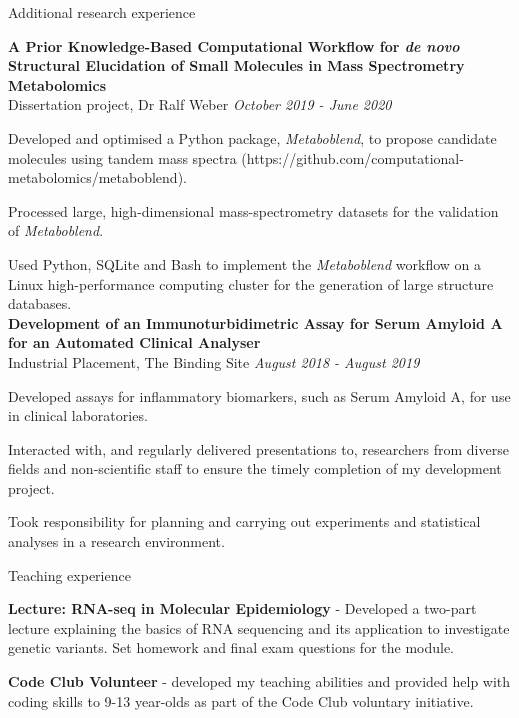 \documentclass{resume}
\begin{document}
\begin{rSection}{Additional research experience}

\vspace{1pt plus 1pt}
\textbf{A Prior Knowledge-Based Computational Workflow for \textit{de novo} Structural Elucidation of Small Molecules in Mass Spectrometry Metabolomics} \\
Dissertation project, Dr Ralf Weber \hfill  \textit{October 2019 - June 2020}

\vspace{2pt plus 1pt minus 1pt}
\item Developed and optimised a Python package, \textit{Metaboblend}, to propose candidate molecules using tandem mass spectra (https://github.com/computational-metabolomics/metaboblend). 
\item Processed large, high-dimensional mass-spectrometry datasets for the validation of \textit{Metaboblend}. 
\item Used Python, SQLite and Bash to implement the \textit{Metaboblend} workflow on a Linux high-performance computing cluster for the generation of large structure databases. \\

\textbf{Development of an Immunoturbidimetric Assay for Serum Amyloid A for an Automated Clinical Analyser} \\
Industrial Placement, The Binding Site \hfill  \textit{August 2018 - August 2019}

\vspace{2pt plus 1pt minus 1pt}
\item Developed assays for inflammatory biomarkers, such as Serum Amyloid A, for use in clinical laboratories.
\item Interacted with, and regularly delivered presentations to, researchers from diverse fields and non-scientific staff to ensure the timely completion of my development project. 
\item Took responsibility for planning and carrying out experiments and statistical analyses in a research environment.

\end{rSection}

\begin{rSection}{Teaching experience}

\item \textbf{Lecture: RNA-seq in Molecular Epidemiology} - Developed a two-part lecture explaining the basics of RNA sequencing and its application to investigate genetic variants. Set homework and final exam questions for the module.
\vspace{2pt plus 1pt minus 1pt}

\item \textbf{Code Club Volunteer} - developed my teaching abilities and provided help with coding skills to 9-13 year-olds as part of the Code Club voluntary initiative.
\vspace{2pt plus 1pt minus 1pt}

\end{rSection}
\end{document}
